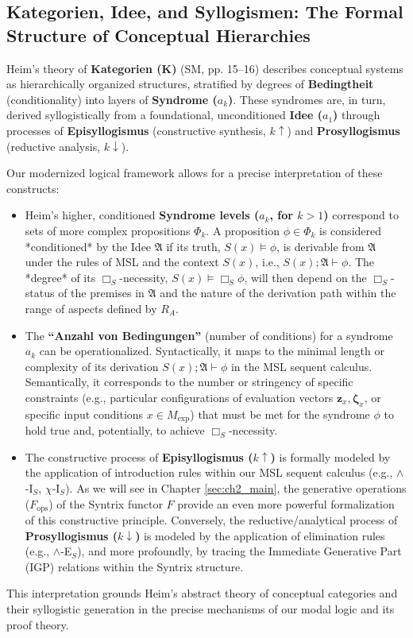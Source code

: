 \documentclass[
    12pt,              %
    a4paper,           %
    headings=normal,   %
    twoside=true,      %
    BCOR=8mm,          %
]{scrbook}
\newcommand{\q}[1]{\enquote{#1}}
\newcommand{\kategorie}{\bm{K}}
\newcommand{\conceptualsyndrome}{a}
\newcommand{\BoxS}{\Box_S}
\newcommand{\Mexp}{M_{\text{exp}}}
\newcommand{\fops}{F_{\text{ops}}}
\begin{document}
\subsection{Kategorien, Idee, and Syllogismen: The Formal Structure of Conceptual Hierarchies}
\label{sec:ch1_revisit_kategorien}

Heim’s theory of \textbf{Kategorien (\(\kategorie\))} (SM, pp. 15--16) describes conceptual systems as hierarchically organized structures, stratified by degrees of \textbf{Bedingtheit} (conditionality) into layers of \textbf{Syndrome (\(\conceptualsyndrome_k\))}. These syndromes are, in turn, derived syllogistically from a foundational, unconditioned \textbf{Idee (\(\conceptualsyndrome_1\))} through processes of \textbf{Episyllogismus} (constructive synthesis, \(k \uparrow\)) and \textbf{Prosyllogismus} (reductive analysis, \(k \downarrow\)).

Our modernized logical framework allows for a precise interpretation of these constructs:
\begin{itemize}
    \item   Heim’s higher, conditioned \textbf{Syndrome levels (\(\conceptualsyndrome_k\), for \(k>1\))} correspond to sets of more complex propositions \(\Phi_k\). A proposition \(\phi \in \Phi_k\) is considered *conditioned* by the Idee \(\mathfrak{A}\) if its truth, \(S(x) \vDash \phi\), is derivable from \(\mathfrak{A}\) under the rules of MSL and the context \(S(x)\), i.e., \(S(x); \mathfrak{A} \vdash \phi\). The *degree* of its \(\BoxS\)-necessity, \(S(x) \vDash \BoxS \phi\), will then depend on the \(\BoxS\)-status of the premises in \(\mathfrak{A}\) and the nature of the derivation path within the range of aspects defined by \(R_A\).
    \item   The \textbf{\q{Anzahl von Bedingungen}} (number of conditions) for a syndrome \(\conceptualsyndrome_k\) can be operationalized. Syntactically, it maps to the minimal length or complexity of its derivation \(S(x); \mathfrak{A} \vdash \phi\) in the MSL sequent calculus. Semantically, it corresponds to the number or stringency of specific constraints (e.g., particular configurations of evaluation vectors \(\mathbf{z}_x, \mathbf{\zeta}_x\), or specific input conditions \(x \in \Mexp\)) that must be met for the syndrome \(\phi\) to hold true and, potentially, to achieve \(\BoxS\)-necessity.
    \item   The constructive process of \textbf{Episyllogismus (\(k \uparrow\))} is formally modeled by the application of introduction rules within our MSL sequent calculus (e.g., \(\land\)-I\(_S\), \(\chi\)-I\(_S\)). As we will see in Chapter \ref{sec:ch2_main}, the generative operations (\(\fops\)) of the Syntrix functor \(F\) provide an even more powerful formalization of this constructive principle. Conversely, the reductive/analytical process of \textbf{Prosyllogismus (\(k \downarrow\))} is modeled by the application of elimination rules (e.g., \(\land\)-E\(_S\)), and more profoundly, by tracing the Immediate Generative Part (IGP) relations within the Syntrix structure.
\end{itemize}
This interpretation grounds Heim's abstract theory of conceptual categories and their syllogistic generation in the precise mechanisms of our modal logic and its proof theory.
\end{document}
